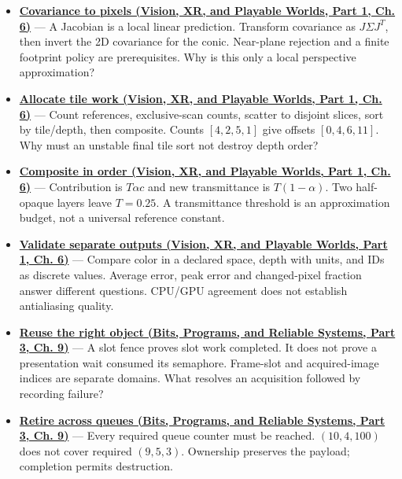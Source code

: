 \begin{itemize}
\item
  \textbf{\href{../07-Vision-XR-and-Playable-Worlds-P01/main.pdf\#04-visual-computing-ii-ch037-local-projection-turns-an-ellipsoid-into-a-screen-ellipse}{Covariance to pixels (Vision, XR, and Playable Worlds, Part 1, Ch. 6)}} --- A Jacobian is a local linear prediction. Transform covariance as \(J\Sigma J^T\), then invert the 2D covariance for the conic. Near-plane rejection and a finite footprint policy are prerequisites. Why is this only a local perspective approximation?
\item
  \textbf{\href{../07-Vision-XR-and-Playable-Worlds-P01/main.pdf\#04-visual-computing-ii-ch037-from-ellipses-to-bounded-tile-work}{Allocate tile work (Vision, XR, and Playable Worlds, Part 1, Ch. 6)}} --- Count references, exclusive-scan counts, scatter to disjoint slices, sort by tile/depth, then composite. Counts \([4,2,5,1]\) give offsets \([0,4,6,11]\). Why must an unstable final tile sort not destroy depth order?
\item
  \textbf{\href{../07-Vision-XR-and-Playable-Worlds-P01/main.pdf\#04-visual-computing-ii-ch037-figure-er1---footprint-compositing-order-and-storage-lifetime}{Composite in order (Vision, XR, and Playable Worlds, Part 1, Ch. 6)}} --- Contribution is \(T\alpha c\) and new transmittance is \(T(1-\alpha)\). Two half-opaque layers leave \(T=0.25\). A transmittance threshold is an approximation budget, not a universal reference constant.
\item
  \textbf{\href{../07-Vision-XR-and-Playable-Worlds-P01/main.pdf\#04-visual-computing-ii-ch037-validation-should-isolate-representations-before-images}{Validate separate outputs (Vision, XR, and Playable Worlds, Part 1, Ch. 6)}} --- Compare color in a declared space, depth with units, and IDs as discrete values. Average error, peak error and changed-pixel fraction answer different questions. CPU/GPU agreement does not establish antialiasing quality.
\item
  \textbf{\href{../01-Bits-Programs-and-Reliable-Systems-P03/main.pdf\#01-foundations-i-ch011-follow-a-frame-slot-and-a-presentation-image-separately}{Reuse the right object (Bits, Programs, and Reliable Systems, Part 3, Ch. 9)}} --- A slot fence proves slot work completed. It does not prove a presentation wait consumed its semaphore. Frame-slot and acquired-image indices are separate domains. What resolves an acquisition followed by recording failure?
\item
  \textbf{\href{../01-Bits-Programs-and-Reliable-Systems-P03/main.pdf\#01-foundations-i-ch011-retire-a-resource-after-every-user-not-after-one-convenient-clock}{Retire across queues (Bits, Programs, and Reliable Systems, Part 3, Ch. 9)}} --- Every required queue counter must be reached. \((10,4,100)\) does not cover required \((9,5,3)\). Ownership preserves the payload; completion permits destruction.

\end{itemize}

